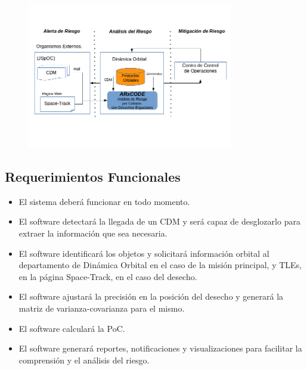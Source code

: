 \begin{figure}
  \includegraphics[width=0.8\textwidth]{imagenes/interfasessistemas}
\end{figure}

\subsection*{Requerimientos Funcionales}
\begin{itemize}
\item El sistema deber\'a funcionar en todo momento.\\
\item El software detectar\'a la llegada de un CDM y ser\'a capaz de desglozarlo para extraer la informaci\'on que sea necesaria.\\
\item El software identificar\'a los objetos y solicitar\'a informaci\'on orbital al departamento de Din\'amica Orbital en el caso de la misi\'on principal, y TLEs, en la p\'agina Space-Track, en el caso del desecho.\\
\item El software ajustar\'a la precisi\'on en la posici\'on del desecho y generar\'a la matriz de varianza-covarianza para el mismo.\\
\item El software calcular\'a la PoC.\\
\item El software generar\'a reportes, notificaciones y visualizaciones para facilitar la comprensi\'on y el an\'alisis del riesgo.
\end{itemize}

